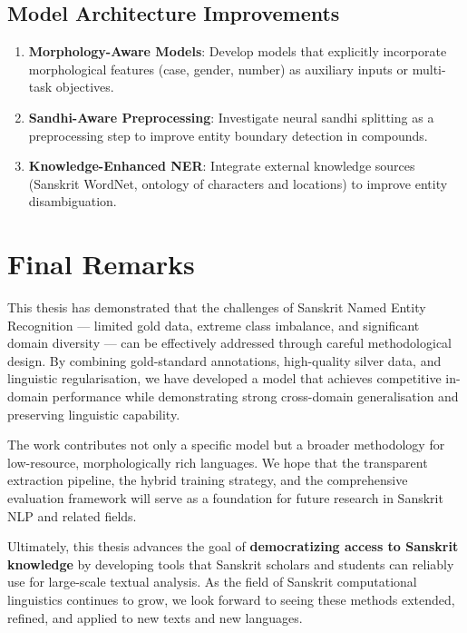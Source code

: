 \subsection{Model Architecture Improvements}

\begin{enumerate}
    \item \textbf{Morphology-Aware Models}: Develop models that explicitly incorporate morphological features (case, gender, number) as auxiliary inputs or multi-task objectives.

    \item \textbf{Sandhi-Aware Preprocessing}: Investigate neural sandhi splitting as a preprocessing step to improve entity boundary detection in compounds.

    \item \textbf{Knowledge-Enhanced NER}: Integrate external knowledge sources (Sanskrit WordNet, ontology of characters and locations) to improve entity disambiguation.
\end{enumerate}

\section{Final Remarks}

This thesis has demonstrated that the challenges of Sanskrit Named Entity Recognition — limited gold data, extreme class imbalance, and significant domain diversity — can be effectively addressed through careful methodological design. By combining gold-standard annotations, high-quality silver data, and linguistic regularisation, we have developed a model that achieves competitive in-domain performance while demonstrating strong cross-domain generalisation and preserving linguistic capability.

The work contributes not only a specific model but a broader methodology for low-resource, morphologically rich languages. We hope that the transparent extraction pipeline, the hybrid training strategy, and the comprehensive evaluation framework will serve as a foundation for future research in Sanskrit NLP and related fields.

Ultimately, this thesis advances the goal of \textbf{democratizing access to Sanskrit knowledge} by developing tools that Sanskrit scholars and students can reliably use for large-scale textual analysis. As the field of Sanskrit computational linguistics continues to grow, we look forward to seeing these methods extended, refined, and applied to new texts and new languages.

